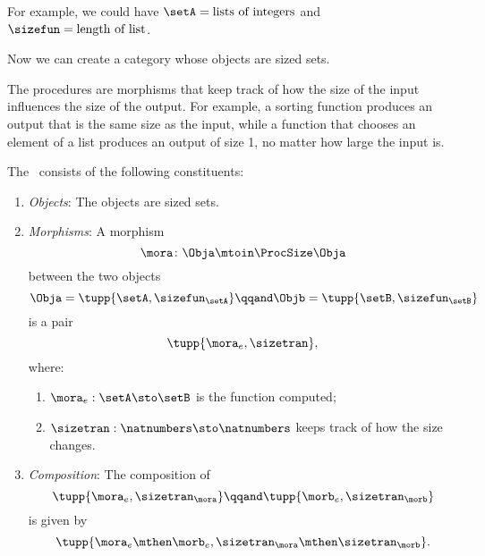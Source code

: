 For example, we could have $\setA = \text{lists of integers}$ and $\sizefun = \text{length of list}$.

Now we can create a category whose objects are sized sets.

The procedures are morphisms that keep track of how the size of the input influences the size of the output.
For example, a sorting function produces an output that is the same size as the input, while a function that chooses an element of a list produces an output of size 1, no matter how large the input is.

\begin{definition}
    \label{def:ProcSize}
    The ~\ProcSize consists of the following constituents:
    \begin{enumerate}
        \item \emph{Objects}: The objects are sized sets.
        \item \emph{Morphisms}: A morphism
              \begin{equation}
                  \mora \colon \Obja \mtoin\ProcSize \Obja
              \end{equation}
              between the two objects
              \begin{equation}
                  \Obja = \tupp{\setA, \sizefun_{\setA}}
                  \qqand
                  \Objb = \tupp{\setB, \sizefun_{\setB}}
              \end{equation}
              is a pair
              \begin{equation}
                  \tupp{\mora_e, \sizetran },
              \end{equation}
              where:
              \begin{enumerate}
                  \item $\mora_e : \setA \sto \setB$ is the function computed;
                  \item $\sizetran: \natnumbers \sto \natnumbers$ keeps track of how the size changes.
              \end{enumerate}

        \item \emph{Composition}: The composition of
              \begin{equation}
                  \tupp{\mora_e, \sizetran_{\mora} } \qqand
                  \tupp{\morb_e, \sizetran_{\morb} }
              \end{equation}
              is given by
              \begin{equation}
                  \tupp{\mora_e \mthen \morb_e,   \sizetran_{\mora} \mthen \sizetran_{\morb} }.
              \end{equation}
    \end{enumerate}
\end{definition}

